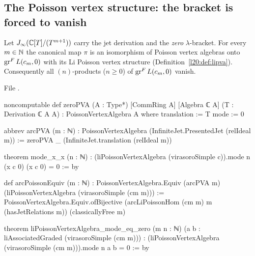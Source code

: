 \subsection{The Poisson vertex structure: the bracket is forced to vanish}

\begin{theorem}\label{l20:thm:virpva}
Let $J_\infty({\mathbb{C}}[T]/(T^{m+1}))$ carry the jet derivation and the \emph{zero} $\lambda$-bracket. For every $m\in{\mathbb{N}}$ the canonical map
$\pi$ is an isomorphism of Poisson vertex algebras onto $\operatorname{gr}^F L(c_m,0)$ with its Li Poisson vertex structure
(Definition~\ref{l20:def:lipva}). Consequently all $(n)$-products ($n\ge0$) of $\operatorname{gr}^F L(c_m,0)$ vanish.
\end{theorem}
\noindent File .
\begin{leancode}
noncomputable def zeroPVA (A : Type*) [CommRing A] [Algebra ℂ A] (T : Derivation ℂ A A) :
    PoissonVertexAlgebra A where
  translation := T
  mode := 0

abbrev arcPVA (m : ℕ) : PoissonVertexAlgebra (InfiniteJet.PresentedJet (relIdeal m)) :=
  zeroPVA _ (InfiniteJet.translation (relIdeal m))

theorem mode_x_x (n : ℕ) :
    (liPoissonVertexAlgebra (virasoroSimple c)).mode n (x c 0) (x c 0) = 0 := by

def arcPoissonEquiv (m : ℕ) :
    PoissonVertexAlgebra.Equiv (arcPVA m) (liPoissonVertexAlgebra (virasoroSimple (cm m))) :=
  PoissonVertexAlgebra.Equiv.ofBijective (arcLiPoissonHom (cm m) m (hasJetRelations m))
    (classicallyFree m)

theorem liPoissonVertexAlgebra_mode_eq_zero (m n : ℕ)
    (a b : liAssociatedGraded (virasoroSimple (cm m))) :
    (liPoissonVertexAlgebra (virasoroSimple (cm m))).mode n a b = 0 := by
\end{leancode}

